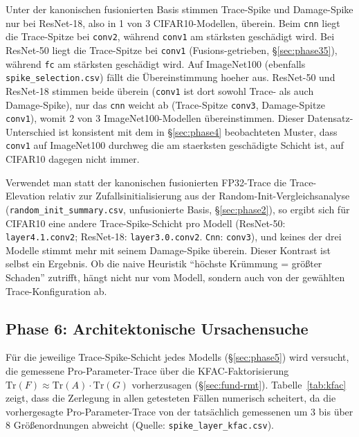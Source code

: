 Unter der kanonischen fusionierten Basis stimmen Trace-Spike und Damage-Spike nur bei ResNet-18, also in 1 von 3 CIFAR10-Modellen, überein. Beim \texttt{cnn} liegt die Trace-Spitze bei \texttt{conv2}, während \texttt{conv1} am stärksten geschädigt wird. Bei ResNet-50 liegt die Trace-Spitze bei \texttt{conv1} (Fusions-getrieben, \S\ref{sec:phase35}), während \texttt{fc} am stärksten geschädigt wird. Auf ImageNet100 (ebenfalls \texttt{spike\_selection.csv}) fällt die Übereinstimmung hoeher aus. ResNet-50 und ResNet-18 stimmen beide überein (\texttt{conv1} ist dort sowohl Trace- als auch Damage-Spike), nur das \texttt{cnn} weicht ab (Trace-Spitze \texttt{conv3}, Damage-Spitze \texttt{conv1}), womit 2 von 3 ImageNet100-Modellen übereinstimmen. Dieser Datensatz-Unterschied ist konsistent mit dem in \S\ref{sec:phase4} beobachteten Muster, dass \texttt{conv1} auf ImageNet100 durchweg die am staerksten geschädigte Schicht ist, auf CIFAR10 dagegen nicht immer.
\par\medskip

Verwendet man statt der kanonischen fusionierten FP32-Trace die Trace-Elevation relativ zur Zufallsinitialisierung aus der Random-Init-Vergleichsanalyse (\texttt{random\_init\_summary.csv}, unfusionierte Basis, \S\ref{sec:phase2}), so ergibt sich für CIFAR10 eine andere Trace-Spike-Schicht pro Modell (ResNet-50: \texttt{layer4.1.conv2}; ResNet-18: \texttt{layer3.0.conv2}. \texttt{Cnn}: \texttt{conv3}), und keines der drei Modelle stimmt mehr mit seinem Damage-Spike überein. Dieser Kontrast ist selbst ein Ergebnis. Ob die naive Heuristik \enquote{höchste Krümmung = größter Schaden} zutrifft, hängt nicht nur vom Modell, sondern auch von der gewählten Trace-Konfiguration ab.

\subsection{Phase 6: Architektonische Ursachensuche}
\label{sec:phase6}

Für die jeweilige Trace-Spike-Schicht jedes Modells (\S\ref{sec:phase5}) wird versucht, die gemessene Pro-Parameter-Trace über die KFAC-Faktorisierung $\mathrm{Tr}(F)\approx\mathrm{Tr}(A)\cdot\mathrm{Tr}(G)$ vorherzusagen (\S\ref{sec:fund-rmt}). Tabelle~\ref{tab:kfac} zeigt, dass die Zerlegung in allen getesteten Fällen numerisch scheitert, da die vorhergesagte Pro-Parameter-Trace von der tatsächlich gemessenen um 3 bis über 8 Größenordnungen abweicht (Quelle: \texttt{spike\_layer\_kfac.csv}).

